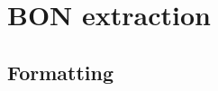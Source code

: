 \section{BON extraction}
\subsection{Formatting}
\label{why_formatter_takes_care_of_formal_and_informal}